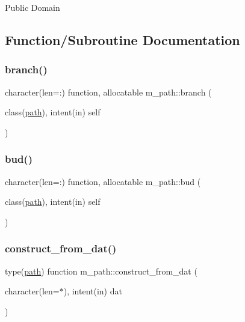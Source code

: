 Public Domain 

\subsection{Function/\+Subroutine Documentation}
\mbox{\label{namespacem__path_a33fc3c25b98c7441f230b91ddc9c40ad}} 
\subsubsection{\texorpdfstring{branch()}{branch()}}
{\footnotesize\ttfamily character(len=\+:) function, allocatable m\+\_\+path\+::branch (\begin{DoxyParamCaption}\item[{class(\mbox{\hyperlink{structm__path_1_1path}{path}}), intent(in)}]{self }\end{DoxyParamCaption})\hspace{0.3cm}{\ttfamily [private]}}

\mbox{\label{namespacem__path_abd678716fe9c893161b30bc80a466097}} 
\subsubsection{\texorpdfstring{bud()}{bud()}}
{\footnotesize\ttfamily character(len=\+:) function, allocatable m\+\_\+path\+::bud (\begin{DoxyParamCaption}\item[{class(\mbox{\hyperlink{structm__path_1_1path}{path}}), intent(in)}]{self }\end{DoxyParamCaption})\hspace{0.3cm}{\ttfamily [private]}}

\mbox{\label{namespacem__path_ae223f8623f7a985d4349e08bc7540d53}} 
\subsubsection{\texorpdfstring{construct\+\_\+from\+\_\+dat()}{construct\_from\_dat()}}
{\footnotesize\ttfamily type(\mbox{\hyperlink{structm__path_1_1path}{path}}) function m\+\_\+path\+::construct\+\_\+from\+\_\+dat (\begin{DoxyParamCaption}\item[{character(len=$\ast$), intent(in)}]{dat }\end{DoxyParamCaption})\hspace{0.3cm}{\ttfamily [private]}}

